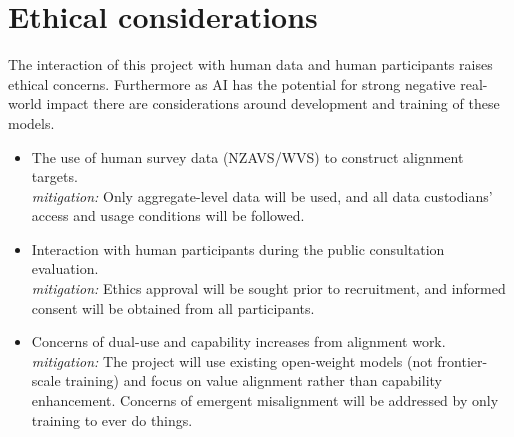 \section{Ethical considerations}

The interaction of this project with human data and human participants raises ethical concerns. Furthermore as AI has the potential for strong negative real-world impact there are considerations around development and training of these models.

\begin{itemize}
  \item The use of human survey data (NZAVS/WVS) to construct alignment targets. \\
  \textit{mitigation:} Only aggregate-level data will be used, and all data custodians' access and usage conditions will be followed.
  \item Interaction with human participants during the public consultation evaluation.\\
  \textit{mitigation:} Ethics approval will be sought prior to recruitment, and informed consent will be obtained from all participants.
  \item Concerns of dual-use and capability increases from alignment work. \\
  \textit{mitigation:} The project will use existing open-weight models (not frontier-scale training) and focus on value alignment rather than capability enhancement. Concerns of emergent misalignment will be addressed by only training to ever do  things.
\end{itemize}